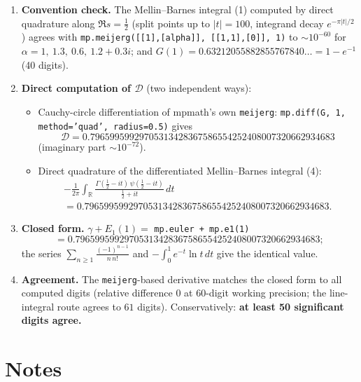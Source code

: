 \documentclass[11pt]{article}
\theoremstyle{remark}
\begin{document}
\begin{enumerate}
\sloppy
\item \textbf{Convention check.} The Mellin--Barnes integral (1) computed by direct quadrature along $\Re s=\tfrac12$ (split points up to $|t|=100$, integrand decay $e^{-\pi|t|/2}$) agrees with \texttt{mp.meijerg([[1],[alpha]], [[1,1],[0]], 1)} to $\sim10^{-60}$ for $\alpha=1,\ 1.3,\ 0.6,\ 1.2+0.3i$; and $G(1)=0.63212055882855767840\ldots=1-e^{-1}$ (40 digits).

\item \textbf{Direct computation of $\mathcal D$} (two independent ways):
\begin{itemize}
\item Cauchy-circle differentiation of mpmath's own \texttt{meijerg}: \texttt{mp.diff(G, 1, method='quad', radius=0.5)} gives
\[\mathcal D = 0.79659959929705313428367586554252408007320662934683\]
(imaginary part $\sim10^{-72}$).
\item Direct quadrature of the differentiated Mellin--Barnes integral (4):
\begin{multline*}
-\frac1{2\pi}\int_{\mathbb R}\frac{\Gamma(\tfrac12-it)\,\psi(\tfrac12-it)}{\tfrac12+it}\,dt\\
= 0.79659959929705313428367586554252408007320662934683.
\end{multline*}
\end{itemize}

\item \textbf{Closed form.} $\gamma+E_1(1)=$ \texttt{mp.euler + mp.e1(1)}
\[=0.79659959929705313428367586554252408007320662934683;\]
the series $\sum_{n\ge1}\frac{(-1)^{n-1}}{n\,n!}$ and $-\int_0^1e^{-t}\ln t\,dt$ give the identical value.

\item \textbf{Agreement.} The \texttt{meijerg}-based derivative matches the closed form to all computed digits (relative difference $0$ at 60-digit working precision; the line-integral route agrees to $61$ digits). Conservatively: \textbf{at least 50 significant digits agree.}
\end{enumerate}

\section*{Notes}
\end{document}
